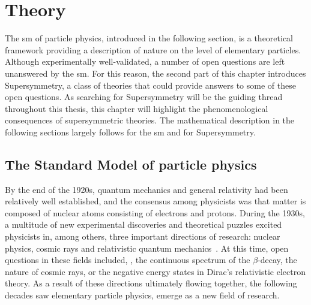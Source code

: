 
\chapter{Theory}

\graphicspath{{chapter-theory/Figs/}}


The \gls{sm} of particle physics, introduced in the following section, is a theoretical framework providing a description of nature on the level of elementary particles. Although experimentally well-validated, a number of open questions are left unanswered by the \gls{sm}.
For this reason, the second part of this chapter introduces Supersymmetry, a class of theories that could provide answers to some of these open questions. As searching for Supersymmetry will be the guiding thread throughout this thesis, this chapter will highlight the phenomenological consequences of supersymmetric theories.
The mathematical description in the following sections largely follows \cite{Brock:1354959, Peskin:1995ev} for the \gls{sm} and \cite{Martin:1997ns,Bustamante:2009us} for Supersymmetry.

\section{The Standard Model of particle physics}

By the end of the 1920s, quantum mechanics and general relativity had been relatively well established, and the consensus among physicists was that matter is composed of nuclear atoms consisting of electrons and protons.
During the 1930s, a multitude of new experimental discoveries and theoretical puzzles excited physicists in, among others, three important directions of research: nuclear physics, cosmic rays and relativistic quantum mechanics~\cite{brown1986the}.
At this time, open questions in these fields included, \eg, the continuous spectrum of the $\beta$-decay, the nature of cosmic rays, or the negative energy states in Dirac's relativistic electron theory. As a result of these directions ultimately flowing together, the following decades saw elementary particle physics, emerge as a new field of research.

